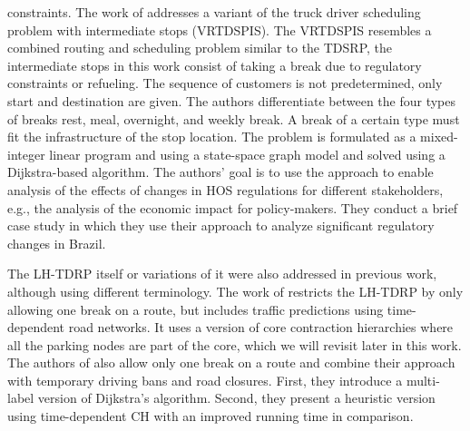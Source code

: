 constraints. The work of \cite{mayerle:2020} addresses a variant of the truck driver scheduling problem with intermediate stops (VRTDSPIS). The VRTDSPIS resembles a combined routing and scheduling problem similar to the TDSRP, the intermediate stops in this work consist of taking a break due to regulatory constraints or refueling. The sequence of customers is not predetermined, only start and destination are given. The authors differentiate between the four types of breaks rest, meal, overnight, and weekly break. A break of a certain type must fit the infrastructure of the stop location. The problem is formulated as a mixed-integer linear program and using a state-space graph model and solved using a Dijkstra-based algorithm. The authors' goal is to use the approach to enable analysis of the effects of changes in HOS regulations for different stakeholders, e.g., the analysis of the economic impact for policy-makers. They conduct a brief case study in which they use their approach to analyze significant regulatory changes in Brazil.

The LH-TDRP itself or variations of it were also addressed in previous work, although using different terminology. The work of \cite{kleff:2017} restricts the LH-TDRP by only allowing one break on a route, but includes traffic predictions using time-dependent road networks. It uses a version of core contraction hierarchies where all the parking nodes are part of the core, which we will revisit later in this work. The authors of \cite{tuin:2018} also allow only one break on a route and combine their approach with temporary driving bans and road closures. First, they introduce a multi-label version of Dijkstra's algorithm. Second, they present a heuristic version using time-dependent CH with an improved running time in comparison.

